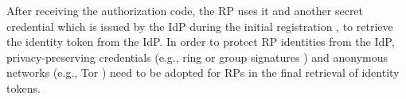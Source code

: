 After receiving the authorization code, the RP uses it and another secret credential
         which is issued by the IdP during the initial registration \cite{OpenIDConnect},
     to retrieve the identity token from the IdP.
In order to protect RP identities from the IdP,
        privacy-preserving credentials (e.g., ring or group signatures \cite{ring-sig,chaum1991group})
        and anonymous networks (e.g., Tor \cite{tor}) need to be adopted for RPs in the final retrieval of identity tokens.










